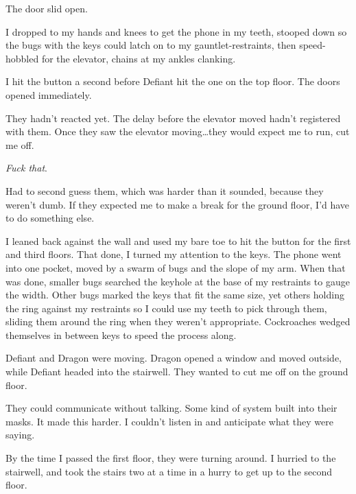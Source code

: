The door slid open.



I dropped to my hands and knees to get the phone in my teeth, stooped down so the bugs with the keys could latch on to my gauntlet-restraints, then speed-hobbled for the elevator, chains at my ankles clanking.



I hit the button a second before Defiant hit the one on the top floor.  The doors opened immediately.



They hadn't reacted yet.  The delay before the elevator moved hadn't registered with them.  Once they saw the elevator moving\ldots they would expect me to run, cut me off.



\emph{Fuck that}.



Had to second guess them, which was harder than it sounded, because they weren't dumb.  If they expected me to make a break for the ground floor, I'd have to do something else.



I leaned back against the wall and used my bare toe to hit the button for the first and third floors.  That done, I turned my attention to the keys.  The phone went into one pocket, moved by a swarm of bugs and the slope of my arm.  When that was done, smaller bugs searched the keyhole at the base of my restraints to gauge the width.  Other bugs marked the keys that fit the same size, yet others holding the ring against my restraints so I could use my teeth to pick through them, sliding them around the ring when they weren't appropriate.  Cockroaches wedged themselves in between keys to speed the process along.



Defiant and Dragon were moving.  Dragon opened a window and moved outside, while Defiant headed into the stairwell.  They wanted to cut me off on the ground floor.



They could communicate without talking.  Some kind of system built into their masks.  It made this harder.  I couldn't listen in and anticipate what they were saying.



By the time I passed the first floor, they were turning around.  I hurried to the stairwell, and took the stairs two at a time in a hurry to get up to the second floor.



